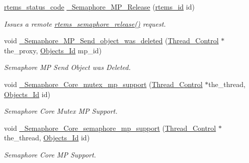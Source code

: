 \begin{DoxyCompactItemize}
\mbox{\label{group__ClassicSEM_gafc01404f8ad14adf485b8ce87e3a8240}} 
\mbox{\hyperlink{group__ClassicStatus_ga545d41846817eaba6143d52ee4d9e9fe}{rtems\+\_\+status\+\_\+code}} \mbox{\hyperlink{group__ClassicSEM_gafc01404f8ad14adf485b8ce87e3a8240}{\+\_\+\+Semaphore\+\_\+\+M\+P\+\_\+\+Release}} (\mbox{\hyperlink{group__ClassicTasks_gab20892b814dced7dd4e5b9bf42becd57}{rtems\+\_\+id}} id)
\begin{DoxyCompactList}\small\item\em Issues a remote \mbox{\hyperlink{group__ClassicSem_gae493f08a92f963ecddc7889181808402}{rtems\+\_\+semaphore\+\_\+release()}} request. \end{DoxyCompactList}\item 
void \mbox{\hyperlink{group__ClassicSEM_ga7a8f00bd895761599a272f8edc077201}{\+\_\+\+Semaphore\+\_\+\+M\+P\+\_\+\+Send\+\_\+object\+\_\+was\+\_\+deleted}} (\mbox{\hyperlink{struct__Thread__Control}{Thread\+\_\+\+Control}} $\ast$the\+\_\+proxy, \mbox{\hyperlink{group__RTEMSScoreObject_ga5821f52a51072941bdd603e542d0863e}{Objects\+\_\+\+Id}} mp\+\_\+id)
\begin{DoxyCompactList}\small\item\em Semaphore MP Send Object was Deleted. \end{DoxyCompactList}\item 
void \mbox{\hyperlink{group__ClassicSEM_ga604f4eeb578725b893398adcaaaed0a1}{\+\_\+\+Semaphore\+\_\+\+Core\+\_\+mutex\+\_\+mp\+\_\+support}} (\mbox{\hyperlink{struct__Thread__Control}{Thread\+\_\+\+Control}} $\ast$the\+\_\+thread, \mbox{\hyperlink{group__RTEMSScoreObject_ga5821f52a51072941bdd603e542d0863e}{Objects\+\_\+\+Id}} id)
\begin{DoxyCompactList}\small\item\em Semaphore Core Mutex MP Support. \end{DoxyCompactList}\item 
void \mbox{\hyperlink{group__ClassicSEM_ga2476d946164b5b2bb2f535f8aaae7daa}{\+\_\+\+Semaphore\+\_\+\+Core\+\_\+semaphore\+\_\+mp\+\_\+support}} (\mbox{\hyperlink{struct__Thread__Control}{Thread\+\_\+\+Control}} $\ast$the\+\_\+thread, \mbox{\hyperlink{group__RTEMSScoreObject_ga5821f52a51072941bdd603e542d0863e}{Objects\+\_\+\+Id}} id)
\begin{DoxyCompactList}\small\item\em Semaphore Core MP Support. \end{DoxyCompactList}\end{DoxyCompactItemize}


